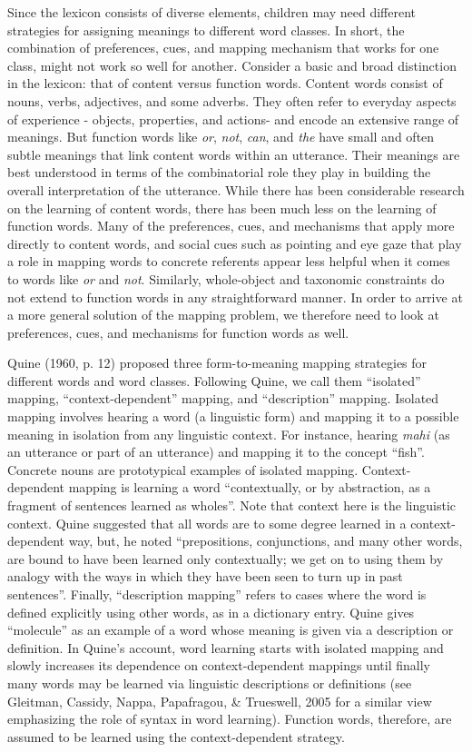 \documentclass[
  ,man,floatsintext]{apa6}
\begin{document}
Since the lexicon consists of diverse elements, children may need different strategies for assigning meanings to different word classes. In short, the combination of preferences, cues, and mapping mechanism that works for one class, might not work so well for another. Consider a basic and broad distinction in the lexicon: that of content versus function words. Content words consist of nouns, verbs, adjectives, and some adverbs. They often refer to everyday aspects of experience - objects, properties, and actions- and encode an extensive range of meanings. But function words like \emph{or}, \emph{not}, \emph{can}, and \emph{the} have small and often subtle meanings that link content words within an utterance. Their meanings are best understood in terms of the combinatorial role they play in building the overall interpretation of the utterance. While there has been considerable research on the learning of content words, there has been much less on the learning of function words. Many of the preferences, cues, and mechanisms that apply more directly to content words, and social cues such as pointing and eye gaze that play a role in mapping words to concrete referents appear less helpful when it comes to words like \emph{or} and \emph{not}. Similarly, whole-object and taxonomic constraints do not extend to function words in any straightforward manner. In order to arrive at a more general solution of the mapping problem, we therefore need to look at preferences, cues, and mechanisms for function words as well.

Quine (1960, p. 12) proposed three form-to-meaning mapping strategies for different words and word classes. Following Quine, we call them ``isolated'' mapping, ``context-dependent'' mapping, and ``description'' mapping. Isolated mapping involves hearing a word (a linguistic form) and mapping it to a possible meaning in isolation from any linguistic context. For instance, hearing \emph{mahi} (as an utterance or part of an utterance) and mapping it to the concept ``fish''. Concrete nouns are prototypical examples of isolated mapping. Context-dependent mapping is learning a word ``contextually, or by abstraction, as a fragment of sentences learned as wholes''. Note that context here is the linguistic context. Quine suggested that all words are to some degree learned in a context-dependent way, but, he noted ``prepositions, conjunctions, and many other words, are bound to have been learned only contextually; we get on to using them by analogy with the ways in which they have been seen to turn up in past sentences''. Finally, ``description mapping'' refers to cases where the word is defined explicitly using other words, as in a dictionary entry. Quine gives ``molecule'' as an example of a word whose meaning is given via a description or definition. In Quine's account, word learning starts with isolated mapping and slowly increases its dependence on context-dependent mappings until finally many words may be learned via linguistic descriptions or definitions (see Gleitman, Cassidy, Nappa, Papafragou, \& Trueswell, 2005 for a similar view emphasizing the role of syntax in word learning). Function words, therefore, are assumed to be learned using the context-dependent strategy.
\end{document}
